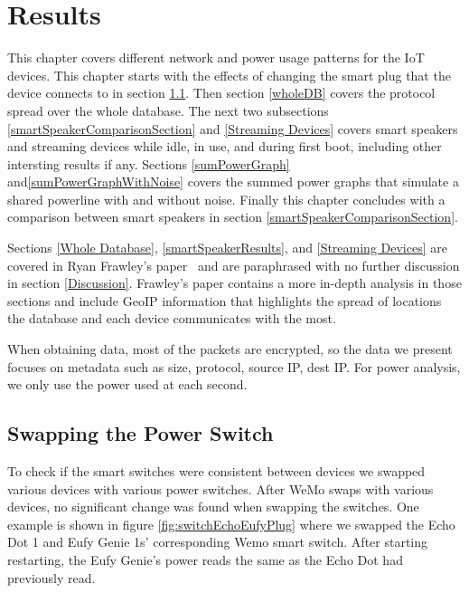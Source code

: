 \chapter{Results}
\label{Results}
This chapter covers different network and power usage patterns for the IoT devices. This chapter starts with the effects of changing the smart plug that the device connects to in section \ref{swappingSwitch}. Then section \ref{wholeDB} covers the protocol spread over the whole database. The next two subsections \ref{smartSpeakerComparisonSection} and \ref{Streaming Devices} covers smart speakers and streaming devices while idle, in use, and during first boot, including other intersting results if any. Sections \ref{sumPowerGraph} and\ref{sumPowerGraphWithNoise} covers the summed power graphs that simulate a shared powerline with and without noise. Finally this chapter concludes with a comparison between smart speakers in section \ref{smartSpeakerComparisonSection}.

Sections \ref{Whole Database}, \ref{smartSpeakerResults}, and \ref{Streaming Devices} are covered in Ryan Frawley's paper~\cite{frawley_2018} and are paraphrased with no further discussion in section \ref{Discussion}. Frawley's paper contains a more in-depth analysis in those sections and include GeoIP information that highlights the spread of locations the database and each device communicates with the most.

When obtaining data, most of the packets are encrypted, so the data we present focuses on metadata such as size, protocol, source IP, dest IP. For power analysis, we only use the power used at each second.

\section{Swapping the Power Switch}
\label{swappingSwitch}
To check if the smart switches were consistent between devices we swapped various devices with various power switches. After WeMo swaps with various devices, no significant change was found when swapping the switches. One example is shown in figure \ref{fig:switchEchoEufyPlug} where we swapped the Echo Dot 1 and Eufy Genie 1s' corresponding Wemo smart switch. After starting restarting, the Eufy Genie's power reads the same as the Echo Dot had previously read.

